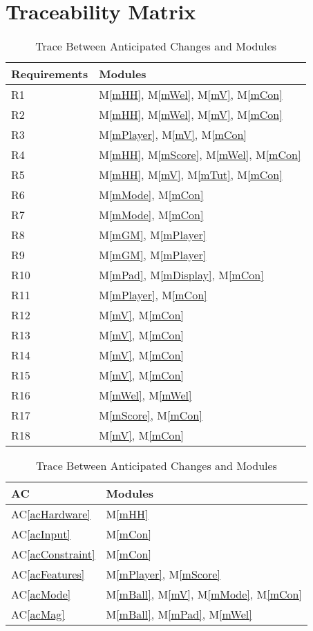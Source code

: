 \documentclass[12pt,letterpaper]{article}
\newcommand{\acref}[1]{AC\ref{#1}}
\newcommand{\mref}[1]{M\ref{#1}}
\begin{document}
	\section{Traceability Matrix} \label{SecTM}
\begin{table}[h!]
\centering
\begin{tabular}{p{} p{}}
\toprule
\textbf{Requirements} & \textbf{Modules}\\
\midrule
{R1} & \mref{mHH}, \mref{mWel}, \mref{mV}, \mref{mCon}\\
{R2} & \mref{mHH}, \mref{mWel}, \mref{mV}, \mref{mCon}\\
{R3} & \mref{mPlayer}, \mref{mV}, \mref{mCon}\\
{R4} & \mref{mHH}, \mref{mScore}, \mref{mWel}, \mref{mCon}\\
{R5} & \mref{mHH}, \mref{mV}, \mref{mTut}, \mref{mCon} \\
{R6} & \mref{mMode}, \mref{mCon} \\
{R7} & \mref{mMode}, \mref{mCon} \\
{R8} & \mref{mGM}, \mref{mPlayer}\\
{R9} & \mref{mGM}, \mref{mPlayer}\\
{R10} & \mref{mPad}, \mref{mDisplay}, \mref{mCon}\\
{R11} & \mref{mPlayer}, \mref{mCon}\\
{R12} & \mref{mV}, \mref{mCon}\\
{R13} & \mref{mV}, \mref{mCon}\\
{R14} & \mref{mV}, \mref{mCon}\\
{R15} & \mref{mV}, \mref{mCon}\\
{R16} & \mref{mWel}, \mref{mWel}\\
{R17} & \mref{mScore}, \mref{mCon}\\
{R18} & \mref{mV}, \mref{mCon}\\
\bottomrule
\end{tabular}
\caption{Trace Between Requirements and Modules}
\label{TblRT}
\centering
\begin{tabular}{p{} p{}}
\toprule
\textbf{AC} & \textbf{Modules}\\
\midrule
\acref{acHardware} & \mref{mHH} \\
\acref{acInput} & \mref{mCon} \\
\acref{acConstraint} & \mref{mCon}\\
\acref{acFeatures} & \mref{mPlayer}, \mref{mScore}\\
\acref{acMode} & \mref{mBall}, \mref{mV}, \mref{mMode}, \mref{mCon} \\
\acref{acMag} & \mref{mBall}, \mref{mPad}, \mref{mWel} \\
\bottomrule
\end{tabular}
\caption{Trace Between Anticipated Changes and Modules}
\label{TblACT}
\end{table}
\clearpage
\end{document}
